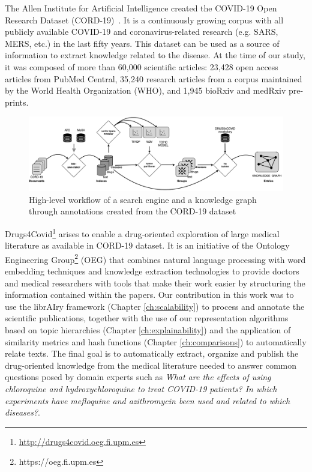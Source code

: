 The Allen Institute for Artificial Intelligence created the COVID-19 Open Research Dataset (CORD-19)~\citep{wang2020cord}. It is a continuously growing corpus with all publicly available COVID-19 and coronavirus-related research (e.g. SARS, MERS, etc.) in the last fifty years. This dataset can be used as a source of information to extract knowledge related to the disease. At the time of our study, it was composed of more than 60,000 scientific articles: 23,428 open access articles from PubMed Central, 35,240 research articles from a corpus maintained by the World Health Organization (WHO), and 1,945 bioRxiv and medRxiv pre-prints. 


\begin{figure}[ht]
    \centering
    \includegraphics[width=0.7\linewidth]{d4c-workflow.png}
    \caption{High-level workflow of a search engine and a knowledge graph through annotations created from the CORD-19 dataset}
    \label{fig:d4c-workflow}
\end{figure}

Drugs4Covid\footnote{\url{http://drugs4covid.oeg.fi.upm.es}}\citep{badenesolmedo2020drugs4covid} arises to enable a drug-oriented exploration of large medical literature as available in CORD-19 dataset. It is an initiative of the Ontology Engineering Group\footnote{https://oeg.fi.upm.es} (OEG) that combines natural language processing with word embedding techniques and knowledge extraction technologies to provide doctors and medical researchers with tools that make their work easier by structuring the information contained within the papers. Our contribution in this work was to use the librAIry framework (Chapter \ref{ch:scalability}) to process and annotate the scientific publications, together with the use of our representation algorithms based on topic hierarchies (Chapter \ref{ch:explainability}) and the application of similarity metrics and hash functions (Chapter \ref{ch:comparisons}) to automatically relate texts. The final goal is to automatically extract, organize and publish the drug-oriented knowledge from the medical literature needed to answer common questions posed by domain experts such as \textit{What are the effects of using chloroquine and hydroxychloroquine to treat COVID-19 patients? In which experiments have mefloquine and azithromycin been used and related to which diseases?}.  

